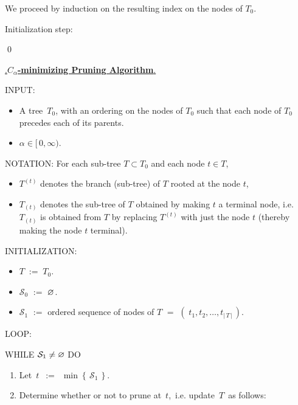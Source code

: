 We proceed by induction on the resulting index on the nodes of $T_{0}$.

Initialization step: 

\qed

\begin{center}
\begin{tcolorbox}[width=0.90\linewidth,colback=white,colframe=gray]
\begin{center}
\vskip 0.2cm
\underline{{\color{white}.}\textbf{\large$C_{\alpha}$-minimizing Pruning Algorithm}{\color{white}.}}
\end{center}
\vskip 0.5cm
INPUT:
\begin{itemize}
\item
	A tree \,$T_{0}$, with an ordering on the nodes of $T_{0}$
	such that each node of $T_{0}$ precedes each of its parents.
\item
	$\alpha \in [\,0,\infty)$.
\end{itemize}
\vskip 0.3cm
NOTATION:
\vskip 0.2cm
For each sub-tree $T \subset T_{0}$ and each node $t \in T$,
\begin{itemize}
\item
	$T^{(t)}$ denotes the branch (sub-tree) of $T$ rooted at the node $t$,
\item
	$T_{(t)}$ denotes the sub-tree of $T$ obtained by making $t$ a terminal node,
	i.e. $T_{(t)}$ is obtained from $T$ by replacing $T^{(t)}$
	with just the node $t$ (thereby making the node $t$ terminal).
\end{itemize}
\vskip 0.3cm
INITIALIZATION:
\begin{itemize}
\item
	$T \; := \; T_{0}$.
\item
	$\mathcal{S}_{0}$ \;$:=$\; $\varnothing$.
\item
	$\mathcal{S}_{1}$
	\;$:=$\;
		\textnormal{ordered sequence of nodes of $T$}
	\;$=$\;
		$\left(\;t_{1}, t_{2}, \ldots, t_{\vert\,T\,\vert}\,\right)$.
\end{itemize}
\vskip 0.3cm
LOOP:
\vskip 0.1cm
\begin{center}
\begin{minipage}{0.85\linewidth}
WHILE \;$\mathcal{S}_{1} \neq \varnothing$\; DO
\begin{enumerate}
\item
	Let \,$t$ \,$:=$\, $\min\!\left\{\,\mathcal{S}_{1}\,\right\}$.
\item
	Determine whether or not to prune at \,$t$,\, i.e. update \,$T$\, as follows:
	\begin{equation*}

\end{equation*}
\end{enumerate}
\end{minipage}
\end{center}
\end{tcolorbox}
\end{center}
